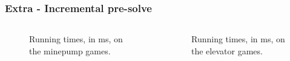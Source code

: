 \documentclass[aspectratio=169]{beamer}
\begin{document}
\begin{frame}[t]
\frametitle{Extra - Incremental pre-solve}
\def\scalegraphs{0.6}
\begin{columns}[T]
	\begin{column}{0.5\textwidth}
		\begin{figure}[H]
			
			\caption{Running times, in ms, on the minepump games.}
			\label{fig:results_minepump}
		\end{figure}%
	\end{column}
	\begin{column}{0.5\textwidth}
		\begin{figure}[H]
			
			\caption{Running times, in ms, on the elevator games.}
			\label{fig:results_elevator}
		\end{figure}%
	\end{column}
\end{columns}
\end{frame}

\end{document}
